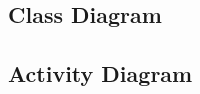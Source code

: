 \subsection{Class Diagram}
\newpage



\newpage


\subsection{Activity Diagram}
\newpage




\newpage




\newpage


\newpage



